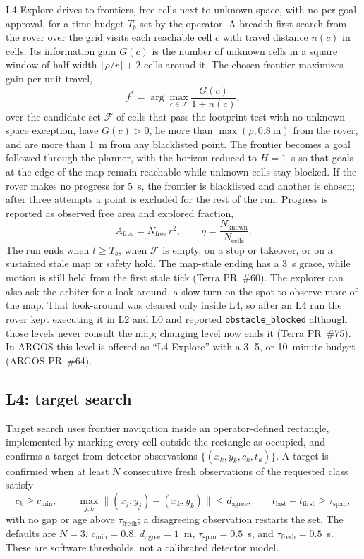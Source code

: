 L4 Explore drives to frontiers, free cells next to unknown space, with no per-goal approval, for a time budget $T_b$ set by the operator.
A breadth-first search from the rover over the grid visits each reachable cell $c$ with travel distance $n(c)$ in cells.
Its information gain $G(c)$ is the number of unknown cells in a square window of half-width $\lceil \rho / r \rceil + 2$ cells around it.
The chosen frontier maximizes gain per unit travel,
\begin{equation}
  f^\ast = \arg\max_{c \in \mathcal{F}} \frac{G(c)}{1 + n(c)},
  \label{eq:frontier}
\end{equation}
over the candidate set $\mathcal{F}$ of cells that pass the footprint test with no unknown-space exception, have $G(c) > 0$, lie more than $\max(\rho, 0.8~\text{m})$ from the rover, and are more than 1~m from any blacklisted point.
The frontier becomes a goal followed through the planner, with the horizon reduced to $H = 1$~s so that goals at the edge of the map remain reachable while unknown cells stay blocked.
If the rover makes no progress for 5~s, the frontier is blacklisted and another is chosen; after three attempts a point is excluded for the rest of the run.
Progress is reported as observed free area and explored fraction,
\begin{equation}
  A_{\text{free}} = N_{\text{free}}\,r^2, \qquad \eta = \frac{N_{\text{known}}}{N_{\text{cells}}}.
\end{equation}
The run ends when $t \ge T_b$, when $\mathcal{F}$ is empty, on a stop or takeover, or on a sustained stale map or safety hold.
The map-stale ending has a 3~s grace, while motion is still held from the first stale tick (Terra PR~\#60).
The explorer can also ask the arbiter for a look-around, a slow turn on the spot to observe more of the map.
That look-around was cleared only inside L4, so after an L4 run the rover kept executing it in L2 and L0 and reported \texttt{obstacle\_blocked} although those levels never consult the map; changing level now ends it (Terra PR~\#75).
In ARGOS this level is offered as ``L4 Explore'' with a 3, 5, or 10~minute budget (ARGOS PR~\#64).

\subsection{L4: target search}

Target search uses frontier navigation inside an operator-defined rectangle, implemented by marking every cell outside the rectangle as occupied, and confirms a target from detector observations $\{(x_k, y_k, c_k, t_k)\}$.
A target is confirmed when at least $N$ consecutive fresh observations of the requested class satisfy
\begin{equation}
  c_k \ge c_{\min}, \qquad \max_{j,k} \lVert (x_j, y_j) - (x_k, y_k) \rVert \le d_{\text{agree}}, \qquad t_{\text{last}} - t_{\text{first}} \ge \tau_{\text{span}},
\end{equation}
with no gap or age above $\tau_{\text{fresh}}$; a disagreeing observation restarts the set.
The defaults are $N = 3$, $c_{\min} = 0.8$, $d_{\text{agree}} = 1$~m, $\tau_{\text{span}} = 0.5$~s, and $\tau_{\text{fresh}} = 0.5$~s.
These are software thresholds, not a calibrated detector model.

